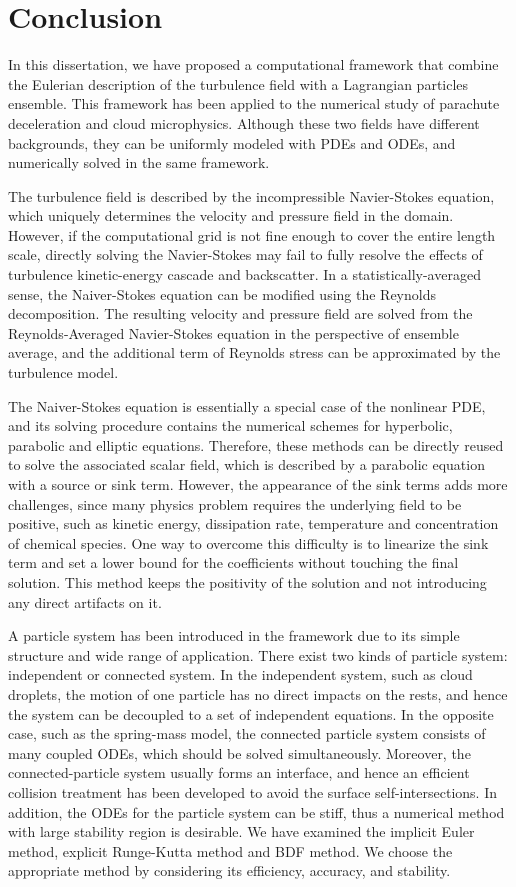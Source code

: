 \chapter{Conclusion}
In this dissertation, we have proposed a computational framework that combine the Eulerian 
description of the turbulence field with a Lagrangian particles ensemble. 
This framework has been applied to the numerical study of parachute deceleration and 
cloud microphysics. Although these two fields have different backgrounds, they can be uniformly  
modeled with PDEs and ODEs, and numerically solved in the same framework.

The turbulence field is described by the incompressible Navier-Stokes equation, which uniquely 
determines the velocity and pressure field in the domain. However, if the computational grid is not 
fine enough to cover the entire length scale, directly solving the Navier-Stokes may fail 
to fully resolve the effects of turbulence kinetic-energy cascade and backscatter. In a statistically-averaged sense, the Naiver-Stokes equation can be modified using the Reynolds decomposition. The resulting velocity and pressure field are solved from the Reynolds-Averaged Navier-Stokes equation in the perspective of ensemble average, and the additional term of Reynolds stress can be approximated by the turbulence model. 

The Naiver-Stokes equation is essentially a special case of the nonlinear PDE, and its solving procedure contains the numerical schemes for hyperbolic, parabolic and elliptic equations. Therefore, these methods can be directly reused to solve the associated scalar field, which is described by a parabolic equation with a source or sink term. However, the appearance of the sink terms adds more challenges, since many physics problem requires the underlying field to be positive, such as kinetic energy, dissipation rate, temperature and concentration of chemical species. One way to overcome this difficulty is to linearize the sink term and set a lower bound for the coefficients without touching the final solution. This method keeps the positivity of the solution and not introducing any direct artifacts on it.

A particle system has been introduced in the framework due to its simple structure and wide range of application. There exist two kinds of particle system: independent or connected system. In the independent system, such as cloud droplets, the motion of one particle has no direct impacts on the rests, and hence the system can be decoupled to a set of independent equations. In the opposite case, such as the spring-mass model, the connected particle system consists of many coupled ODEs, which should be solved simultaneously. Moreover, the connected-particle system usually forms an interface, and hence an efficient collision treatment has been developed to avoid the surface self-intersections. In addition, the ODEs for the particle system can be stiff, thus a numerical method 
with large stability region is desirable. We have examined the implicit Euler method, explicit Runge-Kutta method and BDF method. We choose the appropriate method by considering its efficiency, 
accuracy, and stability.   

